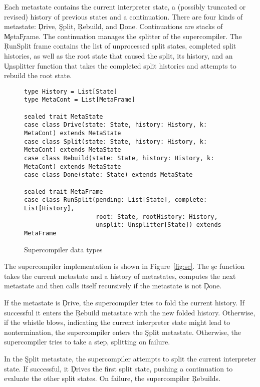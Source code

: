 Each metastate contains the current interpreter state, a (possibly truncated or
revised) history of previous states and a continuation. 
There are four kinds of metastate: \c{Drive}, \c{Split}, \c{Rebuild},
and \c{Done}.
Continuations are stacks of \c{Meta}\-\c{Frame}. The continuation manages the
splitter of the supercompiler.
The \c{RunSplit} frame
contains the list of unprocessed split states, completed split histories,
as well as the root state that caused the split, its history, and an \c{Unsplitter}
function that takes the completed split histories and attempts to rebuild
the root state.

\begin{figure*}
  \begin{verbatim}
type History = List[State]
type MetaCont = List[MetaFrame]

sealed trait MetaState
case class Drive(state: State, history: History, k: MetaCont) extends MetaState
case class Split(state: State, history: History, k: MetaCont) extends MetaState
case class Rebuild(state: State, history: History, k: MetaCont) extends MetaState
case class Done(state: State) extends MetaState

sealed trait MetaFrame
case class RunSplit(pending: List[State], complete: List[History],
                    root: State, rootHistory: History,
                    unsplit: Unsplitter[State]) extends MetaFrame
  \end{verbatim}
  \caption{Supercompiler data types}
  \label{fig:sc-data}
\end{figure*}

The supercompiler implementation is shown in Figure~\ref{fig:sc}.
The \c{sc} function takes the current metastate and a history of
metastates, computes the next metastate and then calls itself recursively
if the metastate is not \c{Done}.

If the metastate is \c{Drive}, the supercompiler tries to fold
the current history. If successful it enters the \c{Rebuild}
metastate with the new folded history.
Otherwise, if the whistle blows, indicating 
the current interpreter state might lead to nontermination,
the supercompiler enters the \c{Split} metastate.
Otherwise, the supercompiler tries to take a step, splitting on failure.

In the \c{Split} metastate, the supercompiler attempts to split
the current interpreter state.
If successful, it \c{Drives} the first split state, pushing a continuation to
evaluate the other split states.
On failure, the supercompiler \c{Rebuilds}.

